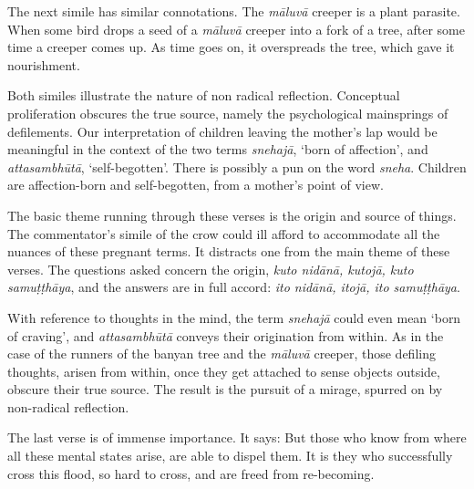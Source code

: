 The next simile has similar connotations. The \emph{māluvā} creeper is a plant parasite. When some bird drops a seed of a \emph{māluvā} creeper into a fork of a tree, after some time a creeper comes up. As time goes on, it overspreads the tree, which gave it nourishment.

Both similes illustrate the nature of non radical reflection. Conceptual proliferation obscures the true source, namely the psychological mainsprings of defilements. Our interpretation of children leaving the mother's lap would be meaningful in the context of the two terms \emph{snehajā}, `born of affection', and \emph{attasambhūtā}, `self-begotten'. There is possibly a pun on the word \emph{sneha}. Children are affection-born and self-begotten, from a mother's point of view.

The basic theme running through these verses is the origin and source of things. The commentator's simile of the crow could ill afford to accommodate all the nuances of these pregnant terms. It distracts one from the main theme of these verses. The questions asked concern the origin, \emph{kuto nidānā, kutojā, kuto samuṭṭhāya}, and the answers are in full accord: \emph{ito nidānā, itojā, ito samuṭṭhāya}.

With reference to thoughts in the mind, the term \emph{snehajā} could even mean `born of craving', and \emph{attasambhūtā} conveys their origination from within. As in the case of the runners of the banyan tree and the \emph{māluvā} creeper, those defiling thoughts, arisen from within, once they get attached to sense objects outside, obscure their true source. The result is the pursuit of a mirage, spurred on by non-radical reflection.

The last verse is of immense importance. It says: But those who know from where all these mental states arise, are able to dispel them. It is they who successfully cross this flood, so hard to cross, and are freed from re-becoming.
